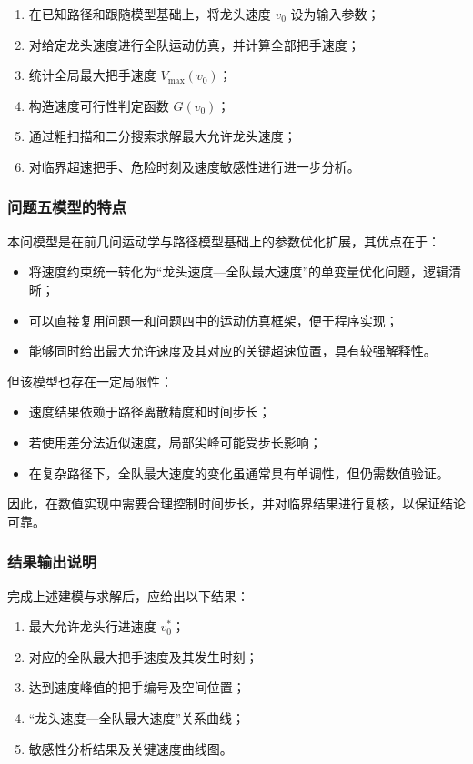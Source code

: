 \documentclass[12pt,a4paper]{ctexart}
\begin{document}
\begin{enumerate}
    \item 在已知路径和跟随模型基础上，将龙头速度 $v_0$ 设为输入参数；
    \item 对给定龙头速度进行全队运动仿真，并计算全部把手速度；
    \item 统计全局最大把手速度 $V_{\max}(v_0)$；
    \item 构造速度可行性判定函数 $G(v_0)$；
    \item 通过粗扫描和二分搜索求解最大允许龙头速度；
    \item 对临界超速把手、危险时刻及速度敏感性进行进一步分析。
\end{enumerate}

\subsubsection{问题五模型的特点}
本问模型是在前几问运动学与路径模型基础上的参数优化扩展，其优点在于：

\begin{itemize}
    \item 将速度约束统一转化为“龙头速度—全队最大速度”的单变量优化问题，逻辑清晰；
    \item 可以直接复用问题一和问题四中的运动仿真框架，便于程序实现；
    \item 能够同时给出最大允许速度及其对应的关键超速位置，具有较强解释性。
\end{itemize}

但该模型也存在一定局限性：

\begin{itemize}
    \item 速度结果依赖于路径离散精度和时间步长；
    \item 若使用差分法近似速度，局部尖峰可能受步长影响；
    \item 在复杂路径下，全队最大速度的变化虽通常具有单调性，但仍需数值验证。
\end{itemize}

因此，在数值实现中需要合理控制时间步长，并对临界结果进行复核，以保证结论可靠。

\subsubsection{结果输出说明}
完成上述建模与求解后，应给出以下结果：

\begin{enumerate}
    \item 最大允许龙头行进速度 $v_0^\ast$；
    \item 对应的全队最大把手速度及其发生时刻；
    \item 达到速度峰值的把手编号及空间位置；
    \item “龙头速度—全队最大速度”关系曲线；
    \item 敏感性分析结果及关键速度曲线图。
\end{enumerate}
\end{document}
